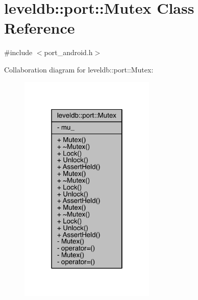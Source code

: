 \hypertarget{classleveldb_1_1port_1_1_mutex}{}\section{leveldb\+:\+:port\+:\+:Mutex Class Reference}
\label{classleveldb_1_1port_1_1_mutex}


{\ttfamily \#include $<$port\+\_\+android.\+h$>$}



Collaboration diagram for leveldb\+:\+:port\+:\+:Mutex\+:\nopagebreak
\begin{figure}[H]
\begin{center}
\leavevmode
\includegraphics[width=183pt]{classleveldb_1_1port_1_1_mutex__coll__graph}
\end{center}
\end{figure}
